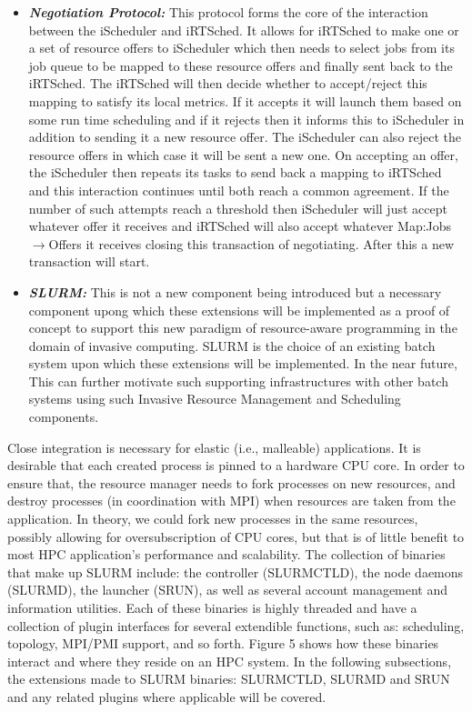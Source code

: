 \begin{itemize}
\item \textbf{\textit{Negotiation Protocol:}} This protocol forms the core of the interaction between the iScheduler and iRTSched. It allows for iRTSched to make one or a set of resource offers to iScheduler which then needs to select jobs from its job queue to be mapped to these resource offers and finally sent back to the iRTSched. The iRTSched will then decide whether to accept/reject this mapping to satisfy its local metrics. If it accepts it will launch them based on some run time scheduling and if it rejects then it informs this to iScheduler in addition to sending it a new resource offer. The iScheduler can also reject the resource offers in which case it will be sent a new one. On accepting an offer, the iScheduler then repeats its tasks to send back a mapping to iRTSched and this interaction continues until both reach a common agreement. If the number of such attempts reach a threshold then iScheduler will just accept whatever offer it receives and iRTSched will also accept whatever Map:Jobs$\rightarrow$Offers it receives closing this transaction of negotiating. After this a new transaction will start.
\item \textbf{\textit{SLURM:}} This is not a new component being introduced but a necessary component upong which these extensions will be implemented as a proof of concept to support this new paradigm of resource-aware programming in the domain of invasive computing. SLURM is the choice of an existing batch system upon which these extensions will be implemented. In the near future, This can further motivate such supporting infrastructures with other batch systems using such Invasive Resource Management and Scheduling components.
\end{itemize}
\noindent
Close integration is necessary for elastic (i.e., malleable) applications. It is desirable that each created process is pinned to a hardware CPU core. In order to ensure that, the resource manager needs to fork processes on new resources, and destroy processes (in coordination with MPI) when resources are taken from the application. In theory, we could fork new processes in the same resources, possibly allowing for oversubscription of CPU cores, but that is of little benefit to most HPC application's performance and scalability. The collection of binaries that make up SLURM include: the controller (SLURMCTLD), the node daemons (SLURMD), the launcher (SRUN), as well as several account management and information utilities. Each of these binaries is highly threaded and have a collection of plugin interfaces for several extendible functions, such as: scheduling, topology, MPI/PMI support, and so forth. Figure 5 shows how these binaries interact and where they reside on an HPC system. In the following subsections, the extensions made to SLURM binaries: SLURMCTLD, SLURMD and SRUN and any related plugins where applicable will be covered.

